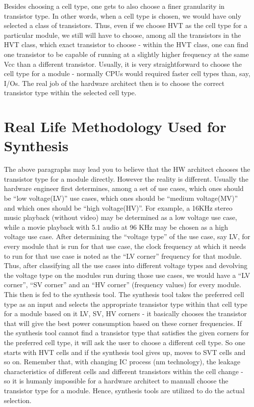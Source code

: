Besides choosing a cell type, one gets to also choose a finer granularity in transistor type. In other words, when a cell type is chosen, we would have only selected a class of transistors. Thus, even if we choose HVT as the cell type for a particular module, we still will have to choose, among all the transistors in the HVT class, which exact transistor to choose - within the HVT class, one can find one transistor to be capable of running at a slightly higher frequency at the same Vcc than a different transistor. Usually, it is very straightforward to choose the cell type for a module - normally CPUs would required faster cell types than, say, I/Os. The real job of the hardware architect then is to choose the correct transistor type within the selected cell type. 

\section{Real Life Methodology Used for Synthesis}
The above paragraphs may lead you to believe that the HW architect chooses the transistor type for a module directly. However the reality is different. Usually the hardware engineer first determines, among a set of use cases, which ones should be ``low voltage(LV)'' use cases, which ones should be ``medium voltage(MV)'' and which ones should be ``high voltage(HV)''. For example, a 16KHz stereo music playback (without video) may be determined as a low voltage use case, while a movie playback with 5.1 audio at 96 KHz may be chosen as a high voltage use case. After determining the ``voltage type'' of the use case, say LV, for every module that is run for that use case, the clock frequency at which it needs to run for that use case is noted as the ``LV corner'' frequency for that module. Thus, after classifying all the use cases into different voltage types and devolving the voltage type on the modules run during those use cases, we would have a ``LV corner'', ``SV corner'' and an ``HV corner'' (frequency values) for every module. This then is fed to the synthesis tool. The synthesis tool takes the preferred cell type as an input and selects the appropriate transistor type within that cell type for a module based on it LV, SV, HV corners - it basically chooses the transistor that will give the best power consumption based on these corner frequencies. If the synthesis tool cannot find a transistor type that satisfies the given corners for the preferred cell type, it will ask the user to choose a different cell type. So one starts with HVT cells and if the synthesis tool gives up, moves to SVT cells and so on. Remember that, with changing IC process (nm technology), the leakage characteristics of different cells and different transistors within the cell change - so it is humanly impossible for a hardware architect to manuall choose the transistor type for a module. Hence, synthesis tools are utilized to do the actual selection.


